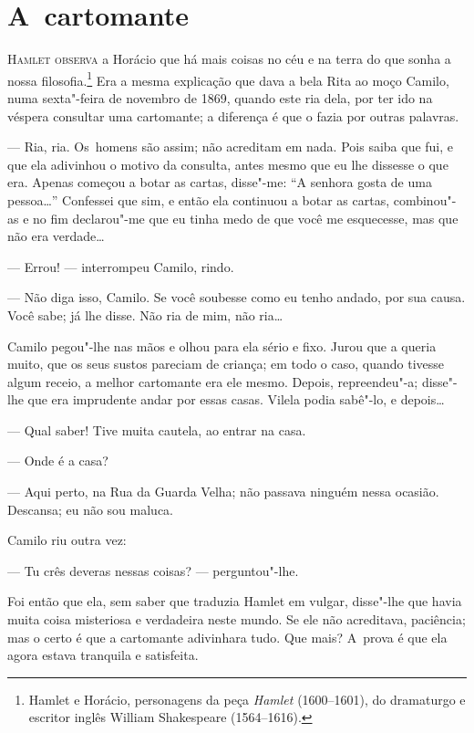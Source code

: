 \chapter{A~cartomante}

\begin{linenumbers}

\textsc{Hamlet observa} a Horácio que há mais coisas no céu e na terra do que
sonha a nossa filosofia.\footnote{Hamlet e Horácio, personagens da peça
  \emph{Hamlet} (1600--1601), do dramaturgo e escritor inglês William
  Shakespeare (1564--1616).} Era a mesma explicação que dava a bela Rita
ao moço Camilo, numa sexta"-feira de novembro de 1869, quando este ria
dela, por ter ido na véspera consultar uma cartomante; a diferença é que
o fazia por outras palavras.

--- Ria, ria. Os~homens são assim; não acreditam em nada. Pois saiba que
fui, e que ela adivinhou o motivo da consulta, antes mesmo que eu lhe
dissesse o que era. Apenas começou a botar as cartas, disse"-me: ``A
senhora gosta de uma pessoa\ldots{}'' Confessei que sim, e então ela
continuou a botar as cartas, combinou"-as e no fim declarou"-me que eu
tinha medo de que você me esquecesse, mas que não era verdade\ldots{}

--- Errou! --- interrompeu Camilo, rindo.

--- Não diga isso, Camilo. Se você soubesse como eu tenho andado, por sua
causa. Você sabe; já lhe disse. Não ria de mim, não ria\ldots{}

Camilo pegou"-lhe nas mãos e olhou para ela sério e fixo. Jurou que a
queria muito, que os seus sustos pareciam de criança; em todo o caso,
quando tivesse algum receio, a melhor cartomante era ele mesmo. Depois,
repreendeu"-a; disse"-lhe que era imprudente andar por essas casas. Vilela
podia sabê"-lo, e depois\ldots{}

--- Qual saber! Tive muita cautela, ao entrar na casa.

--- Onde é a casa?

--- Aqui perto, na Rua da Guarda Velha; não passava ninguém nessa
ocasião. Descansa; eu não sou maluca.

Camilo riu outra vez:

--- Tu crês deveras nessas coisas? --- perguntou"-lhe.

Foi então que ela, sem saber que traduzia Hamlet em vulgar, disse"-lhe
que havia muita coisa misteriosa e verdadeira neste mundo. Se ele não
acreditava, paciência; mas o certo é que a cartomante adivinhara tudo.
Que mais? A~prova é que ela agora estava tranquila e satisfeita.


\end{linenumbers}
